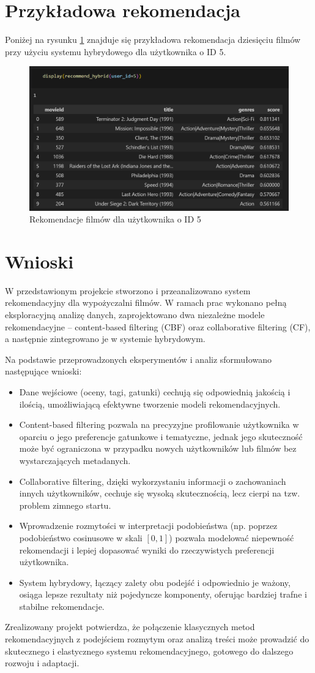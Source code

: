 \documentclass{article}
\begin{document}
\section{Przykładowa rekomendacja}
Poniżej na rysunku \ref{fig:results} znajduje się przykładowa rekomendacja dziesięciu filmów przy użyciu systemu hybrydowego dla użytkownika o ID 5.
\begin{figure}[H]
\centering
\includegraphics[width=1\textwidth]{pictures/results.png}
\caption{Rekomendacje filmów dla użytkownika o ID 5}
\label{fig:results}
\end{figure}

\section{Wnioski}
W przedstawionym projekcie stworzono i przeanalizowano system rekomendacyjny dla wypożyczalni filmów. W ramach prac wykonano pełną eksploracyjną analizę danych, zaprojektowano dwa niezależne modele rekomendacyjne – content-based filtering (CBF) oraz collaborative filtering (CF), a następnie zintegrowano je w systemie hybrydowym.

Na podstawie przeprowadzonych eksperymentów i analiz sformułowano następujące wnioski:
\begin{itemize}
    \item Dane wejściowe (oceny, tagi, gatunki) cechują się odpowiednią jakością i ilością, umożliwiającą efektywne tworzenie modeli rekomendacyjnych.
    \item Content-based filtering pozwala na precyzyjne profilowanie użytkownika w oparciu o jego preferencje gatunkowe i tematyczne, jednak jego skuteczność może być ograniczona w przypadku nowych użytkowników lub filmów bez wystarczających metadanych.
    \item Collaborative filtering, dzięki wykorzystaniu informacji o zachowaniach innych użytkowników, cechuje się wysoką skutecznością, lecz cierpi na tzw. problem zimnego startu.
    \item Wprowadzenie rozmytości w interpretacji podobieństwa (np. poprzez podobieństwo cosinusowe w skali $[0,1]$) pozwala modelować niepewność rekomendacji i lepiej dopasować wyniki do rzeczywistych preferencji użytkownika.
    \item System hybrydowy, łączący zalety obu podejść i odpowiednio je ważony, osiąga lepsze rezultaty niż pojedyncze komponenty, oferując bardziej trafne i stabilne rekomendacje.
\end{itemize}

Zrealizowany projekt potwierdza, że połączenie klasycznych metod rekomendacyjnych z podejściem rozmytym oraz analizą treści może prowadzić do skutecznego i elastycznego systemu rekomendacyjnego, gotowego do dalszego rozwoju i adaptacji.
\end{document}
